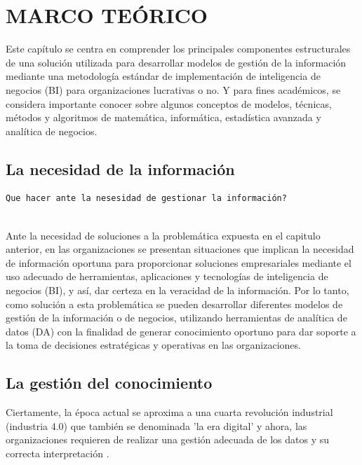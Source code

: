 \documentclass[11pt,titlepage]{report}
\begin{document}
\chapter{MARCO TEÓRICO} 

Este capítulo se centra en comprender los principales componentes estructurales de una solución utilizada para desarrollar modelos de gestión de la información mediante una metodología estándar de implementación de inteligencia de negocios (BI) para organizaciones lucrativas o no. Y para fines académicos, se considera importante conocer sobre algunos conceptos de modelos, técnicas, métodos y algoritmos de matemática, informática, estadística avanzada y analítica de negocios.

\newpage
\section{La necesidad de la información}

\begin{verbatim}
Que hacer ante la nesesidad de gestionar la información?
\end{verbatim}\\

Ante la necesidad de soluciones a la problemática expuesta en el capitulo anterior, en las organizaciones se presentan situaciones que implican la necesidad de información oportuna para proporcionar soluciones empresariales mediante el uso adecuado de herramientas, aplicaciones y tecnologías de inteligencia de negocios (BI), y así, dar certeza en la veracidad de la información. Por lo tanto, como solución a esta problemática se pueden desarrollar diferentes modelos de gestión de la información o de negocios, utilizando herramientas de analítica de datos (DA) con la finalidad de generar conocimiento oportuno para dar soporte a la toma de decisiones estratégicas y operativas en las organizaciones.\\

\section{La gestión del conocimiento}

Ciertamente, la época actual se aproxima a una cuarta revolución industrial (industria 4.0) que también se denominada 'la era digital' y ahora, las organizaciones requieren de realizar una gestión adecuada de los datos y su correcta interpretación \cite{art03}.\\
\end{document}
